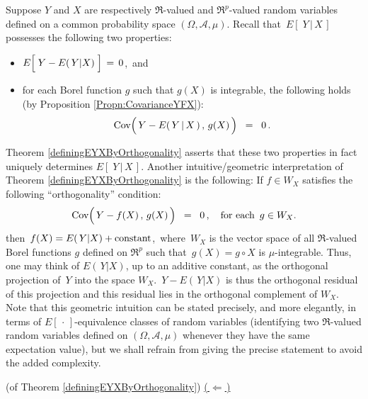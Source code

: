 \begin{remark}\quad
Suppose $Y$ and $X$ are respectively $\Re$-valued and $\Re^{p}$-valued random variables
defined on a common probability space $(\Omega,\mathcal{A},\mu)$.
Recall that \,$E\!\left[\;Y\,\vert\,X\,\right]$\, possesses the following two properties:
\begin{itemize}
\item
	$E\!\left[\;Y \overset{{\color{white}.}}{-} E\!\left(\,Y\vert X\right)\;\right] \,=\, 0$,\, and
\item
	for each Borel function $g$ such that $g(X)$ is integrable,
	the following holds (by Proposition \ref{Propn:CovarianceYFX}):
	\begin{equation*}
	\Cov\!\left(\,\overset{{\color{white}.}}{Y} - E(\,Y\,\vert\,X\,)\,,\,g(X)\,\right)
	\;\; = \;\; 0 \,.
	\end{equation*}
\end{itemize}
Theorem \ref{definingEYXByOrthogonality} asserts that these two properties
in fact uniquely determines $E\!\left[\;Y\,\vert\,X\,\right]$.
Another intuitive/geometric interpretation of Theorem \ref{definingEYXByOrthogonality}
is the following:
\vskip 0.3cm
\noindent
If $f \in W_{X}$ satisfies the following ``orthogonality'' condition:
\begin{equation*}
\Cov\!\left(\,\overset{{\color{white}.}}{Y} - f(X)\,,\,g(X)\,\right)
\;\; = \;\; 0 \,,
\quad
\textnormal{for each \,$g \in W_{X}$.}
\end{equation*}
then \,$f(X) = E\!\left(\,Y\vert X\right) + \textnormal{constant}$,\,
where \,$W_{X}$ is the vector space of all $\Re$-valued Borel functions $g$ defined on
$\Re^{p}$ such that \,$g(X) = g \circ X$ is $\mu$-integrable.
Thus, one may think of $E\!\left(\,Y\vert X\right)$, up to an additive constant, as the
{\color{red}orthogonal projection} of \,$Y$ into the space $W_{X}$.
\,$Y - E\!\left(\,Y\vert X\right)$ is thus the orthogonal residual of this projection and
this residual lies in the orthogonal complement of $W_{X}$.
\vskip 0.3cm
\noindent
Note that this geometric intuition can be stated precisely, and more elegantly, in
terms of $E\!\left[\,\cdot\,\right]$-equivalence classes of random variables
(identifying two $\Re$-valued random variables defined on $(\Omega,\mathcal{A},\mu)$
whenever they have the same expectation value), but we shall
refrain from giving the precise statement to avoid the added complexity.
\end{remark}
\proofof(of Theorem \ref{definingEYXByOrthogonality})
\vskip 0.1cm
\noindent
\underline{(\,$\Longleftarrow$\,)}\quad

